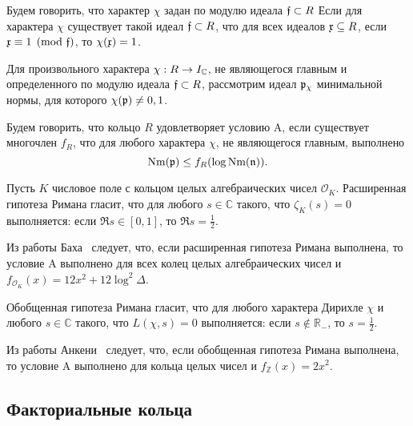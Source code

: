 \documentclass[_00_dissertation.tex]{subfiles}
\begin{document}
\begin{definition}
    Будем говорить, что характер $\chi$ задан по модулю идеала $\mathfrak{f} \subset R$
    Если для характера $\chi$ существует такой идеал $\mathfrak{f} \subset R$, что для всех идеалов $\mathfrak{x} \subseteq R$, если $\mathfrak{x} \equiv 1 \pmod{\mathfrak{f}}$, то $\chi(\mathfrak{x}) = 1$.
\end{definition}

\begin{definition}
    Для произвольного характера $\chi: R \to I_{\mathbb{C}}$, не являющегося главным и определенного по модулю идеала $\mathfrak{f} \subset R$, рассмотрим идеал $\mathfrak{p}_{\chi}$ минимальной нормы, для которого $\chi(\mathfrak{p}) \neq 0, 1$.

    Будем говорить, что кольцо $R$ удовлетворяет условию A, если существует многочлен $f_R$, что для любого характера $\chi$, не являющегося главным, выполнено
    \begin{equation*}
        \textrm{Nm}(\mathfrak{p}) \le f_R(\log{\textrm{Nm}(\mathfrak{n})}).
    \end{equation*}
\end{definition}

\begin{remark}
    Пусть $K$ числовое поле с кольцом целых алгебраических чисел $\mathcal{O}_K$.
    Расширенная гипотеза Римана гласит, что для любого $s \in \mathbb{C}$ такого, что $\zeta_K(s) = 0$ выполняется: если $\Re{s} \in [0, 1]$, то $\Re{s} = \frac{1}{2}$.

    Из работы Баха~\cite{source:Bach} следует, что, если расширенная гипотеза Римана выполнена, то условие A выполнено для всех колец целых алгебраических чисел и $f_{\mathcal{O}_K}(x) = 12x^2 + 12\log^2 \Delta$.
\end{remark}

\begin{remark}
    Обобщенная гипотеза Римана гласит, что для любого характера Дирихле $\chi$ и любого $s \in \mathbb{C}$ такого, что $L(\chi, s) = 0$ выполняется: если $s \not\in \mathbb{R}_{-}$, то $s = \frac{1}{2}$.

    Из работы Анкени~\cite{source:Ankeny} следует, что, если обобщенная гипотеза Римана выполнена, то условие A выполнено для кольца целых чисел и $f_{\mathbb{Z}}(x) = 2x^2$.
\end{remark}

\subsection{Факториальные кольца}
\end{document}
